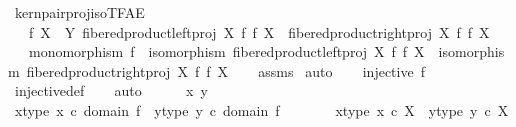 \begin{isabellebody}
\isadelimproof
\isanewline
%
\endisadelimproof
\isanewline
{}\isamarkupfalse%
\ kern{\isacharunderscore}{\kern0pt}pair{\isacharunderscore}{\kern0pt}proj{\isacharunderscore}{\kern0pt}iso{\isacharunderscore}{\kern0pt}TFAE{}{\isacharcolon}{\kern0pt}\isanewline
\ \ \ {\isachardoublequoteopen}f{\isacharcolon}{\kern0pt}\ X\ {\isasymrightarrow}\ Y{\isachardoublequoteclose}\ {\isachardoublequoteopen}fibered{\isacharunderscore}{\kern0pt}product{\isacharunderscore}{\kern0pt}left{\isacharunderscore}{\kern0pt}proj\ X\ f\ f\ X\ {\isacharequal}{\kern0pt}\ fibered{\isacharunderscore}{\kern0pt}product{\isacharunderscore}{\kern0pt}right{\isacharunderscore}{\kern0pt}proj\ X\ f\ f\ X{\isachardoublequoteclose}\isanewline
\ \ \ {\isachardoublequoteopen}monomorphism\ f\ {\isasymand}\ isomorphism\ {\isacharparenleft}{\kern0pt}fibered{\isacharunderscore}{\kern0pt}product{\isacharunderscore}{\kern0pt}left{\isacharunderscore}{\kern0pt}proj\ X\ f\ f\ X{\isacharparenright}{\kern0pt}\ {\isasymand}\ isomorphism\ {\isacharparenleft}{\kern0pt}fibered{\isacharunderscore}{\kern0pt}product{\isacharunderscore}{\kern0pt}right{\isacharunderscore}{\kern0pt}proj\ X\ f\ f\ X{\isacharparenright}{\kern0pt}{\isachardoublequoteclose}\isanewline
%
\isadelimproof
\ \ %
\endisadelimproof
%
\isatagproof
{}\isamarkupfalse%
\ assms\isanewline
{}\isamarkupfalse%
\ auto\isanewline
\ \ \isamarkupfalse%
\ {\isachardoublequoteopen}injective\ f{\isachardoublequoteclose}\isanewline
\ \ \ \ \isamarkupfalse%
\ injective{\isacharunderscore}{\kern0pt}def\isanewline
\ \ \isamarkupfalse%
\ auto\isanewline
\ \ \ \ \isamarkupfalse%
\ x\ y\isanewline
\ \ \ \ \isamarkupfalse%
\ x{\isacharunderscore}{\kern0pt}type{\isacharcolon}{\kern0pt}\ {\isachardoublequoteopen}x\ {\isasymin}\isactrlsub c\ domain\ f{\isachardoublequoteclose}\ \ y{\isacharunderscore}{\kern0pt}type{\isacharcolon}{\kern0pt}\ {\isachardoublequoteopen}y\ {\isasymin}\isactrlsub c\ domain\ f{\isachardoublequoteclose}\isanewline
\ \ \ \ \isamarkupfalse%
\ \isamarkupfalse%
\ x{\isacharunderscore}{\kern0pt}type{}{\isacharcolon}{\kern0pt}\ {\isachardoublequoteopen}x\ {\isasymin}\isactrlsub c\ X{\isachardoublequoteclose}\ \ y{\isacharunderscore}{\kern0pt}type{}{\isacharcolon}{\kern0pt}\ {\isachardoublequoteopen}y\ {\isasymin}\isactrlsub c\ X{\isachardoublequoteclose}\isanewline
\ \ \ \ \ \ \isamarkupfalse%

\end{isabellebody}
